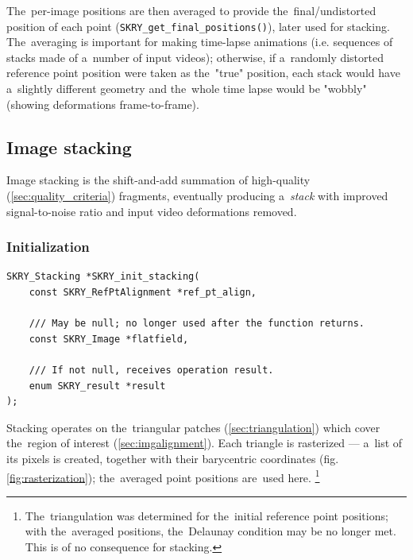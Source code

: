 \documentclass[12pt]{article}
\newcommand{\nbd}{\nobreakdash}
\begin{document}
The~per-image positions are then averaged to provide the~final/undistorted position of each point
(\lstinline{SKRY_get_final_positions()}), later used for stacking. The~averaging is important for making time\nbd-lapse
animations (i.e. sequences of stacks made of a~number of input videos); otherwise, if a~randomly distorted reference
point position were taken as the~"true" position, each stack would have a~slightly different geometry and the~whole
time lapse would be "wobbly" (showing deformations frame\nbd-to\nbd-frame).

\subsection{Image stacking}\label{sec:stacking}

Image stacking is the shift-and-add summation of high-quality (\ref{sec:quality_criteria}) fragments, eventually
producing a~\emph{stack} with improved signal\nbd-to\nbd-noise ratio and input video deformations removed.

\subsubsection{Initialization}

\begin{lstlisting}[caption={Stacking initialization ({\ttfamily{stacking.h/.c}})}]
SKRY_Stacking *SKRY_init_stacking(
    const SKRY_RefPtAlignment *ref_pt_align,

    /// May be null; no longer used after the function returns.
    const SKRY_Image *flatfield,

    /// If not null, receives operation result.
    enum SKRY_result *result
);
\end{lstlisting}

Stacking operates on the~triangular patches (\ref{sec:triangulation}) which cover the~region of interest
(\ref{sec:imgalignment}). Each triangle is rasterized --- a~list of its pixels is created, together with their
barycentric coordinates (fig. \ref{fig:rasterization}); the~averaged point positions are~used here.
\footnote{The~triangulation was determined for the~initial reference point positions; with the~averaged positions,
the~Delaunay condition may be no longer met. This is of no consequence for stacking.}
\end{document}
